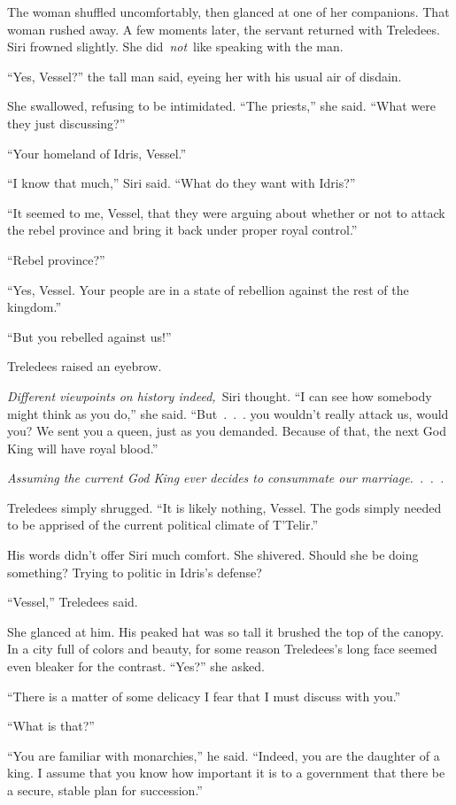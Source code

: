 The woman shuffled uncomfortably, then glanced at one of her companions. That woman rushed away. A few moments later, the servant returned with Treledees. Siri frowned slightly. She did~\textit{not}~like speaking with the man.

“Yes, Vessel?” the tall man said, eyeing her with his usual air of disdain.

She swallowed, refusing to be intimidated. “The priests,” she said. “What were they just discussing?”

“Your homeland of Idris, Vessel.”

“I know that much,” Siri said. “What do they want with Idris?”

“It seemed to me, Vessel, that they were arguing about whether or not to attack the rebel province and bring it back under proper royal control.”

“Rebel province?”

“Yes, Vessel. Your people are in a state of rebellion against the rest of the kingdom.”

“But you rebelled against us!”

Treledees raised an eyebrow.

\textit{Different viewpoints on history indeed,}~Siri thought. “I can see how somebody might think as you do,” she said. “But~.~.~. you wouldn’t really attack us, would you? We sent you a queen, just as you demanded. Because of that, the next God King will have royal blood.”

\textit{Assuming the current God King ever decides to consummate our marriage.~.~.~.}

Treledees simply shrugged. “It is likely nothing, Vessel. The gods simply needed to be apprised of the current political climate of T’Telir.”

His words didn’t offer Siri much comfort. She shivered. Should she be doing something? Trying to politic in Idris’s defense?

“Vessel,” Treledees said.

She glanced at him. His peaked hat was so tall it brushed the top of the canopy. In a city full of colors and beauty, for some reason Treledees’s long face seemed even bleaker for the contrast. “Yes?” she asked.

“There is a matter of some delicacy I fear that I must discuss with you.”

“What is that?”

“You are familiar with monarchies,” he said. “Indeed, you are the daughter of a king. I assume that you know how important it is to a government that there be a secure, stable plan for succession.”

